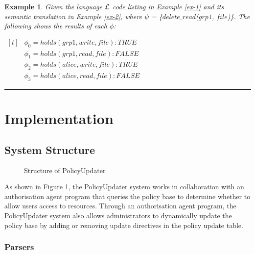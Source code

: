\documentclass[11pt, twocolumn]{article}
\newtheorem{vexmpl}{Example}
\newenvironment{vexample}
  {\begin{vexmpl}\rm}
  {\rule{2mm}{2mm}\end{vexmpl}}
\newenvironment{vquote}
  {\begin{list}{}{\leftmargin 1em}\item[]}
  {\end{list}}
\begin{document}
    \begin{vexample}
      \label{ex-3}
      Given the language ${\cal L}$ code listing in Example \ref{ex-1} and its
      semantic translation in Example \ref{ex-2}, where $\psi$ =
      \{$delete\_read$($grp1$, $file$)\}. The following shows the
      results of each $\phi$:

      \begin{vquote}
        \begin{math}
          \begin{aligned}[t]
            &\phi_{0} = holds(grp1, write, file) : TRUE \\
            &\phi_{1} = holds(grp1, read, file) : FALSE \\
            &\phi_{2} = holds(alice, write, file) : TRUE \\
            &\phi_{3} = holds(alice, read, file) : FALSE
          \end{aligned}
        \end{math}
      \end{vquote}
    \end{vexample}

  \section{Implementation}
    \label{sec-implement}

    \subsection{System Structure}

    \begin{figure}[ht]
      \begin{center}
        \caption{Structure of PolicyUpdater}
        \label{fig-1}
      \end{center}
    \end{figure}

      As shown in Figure \ref{fig-1}, the PolicyUpdater system works in
      collaboration with an authorisation agent program that queries the
      policy base to determine whether to allow users access to resources.
      Through an authorisation agent program, the PolicyUpdater system also
      allows administrators to dynamically update the policy base by adding
      or removing update directives in the policy update table.

      \subsubsection{Parsers}
\end{document}
